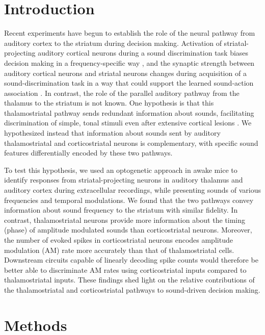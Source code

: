 \section{Introduction}
Recent experiments have begun to establish the role of the neural pathway from auditory cortex to the striatum during decision making.
%
Activation of striatal-projecting auditory cortical neurons during a sound discrimination task biases decision making in a frequency-specific way \citep{Znamenskiy2013}, and the synaptic strength between auditory cortical neurons and striatal neurons changes during acquisition of a sound-discrimination task in a way that could support the learned sound-action association \citep{Xiong2015}. 
%
In contrast, the role of the parallel auditory pathway from the thalamus to the striatum is not known.
%
One hypothesis is that this thalamostriatal pathway sends redundant information about sounds, facilitating discrimination of simple, tonal stimuli even after extensive cortical lesions \citep{Gimenez2015, Guo2017}.
%
We hypothesized instead that information about sounds sent by auditory thalamostriatal and corticostriatal neurons is complementary, with specific sound features differentially encoded by these two pathways.

To test this hypothesis, we used an optogenetic approach in awake mice to identify responses from striatal-projecting neurons in auditory thalamus and auditory cortex during extracellular recordings, while presenting sounds of various frequencies and temporal modulations.
%
We found that the two pathways convey information about sound frequency to the striatum with similar fidelity.
%
In contrast, thalamostriatal neurons provide more information about the timing (phase) of amplitude modulated sounds than corticostriatal neurons.
Moreover, the number of evoked spikes in corticostriatal neurons encodes amplitude modulation (AM) rate more accurately than that of thalamostriatal cells. 
%
Downstream circuits capable of linearly decoding spike counts would therefore be better able to discriminate AM rates using corticostriatal inputs compared to thalamostriatal inputs.
%
These findings shed light on the relative contributions of the thalamostriatal and corticostriatal pathways to sound-driven decision making.

\section{Methods}
